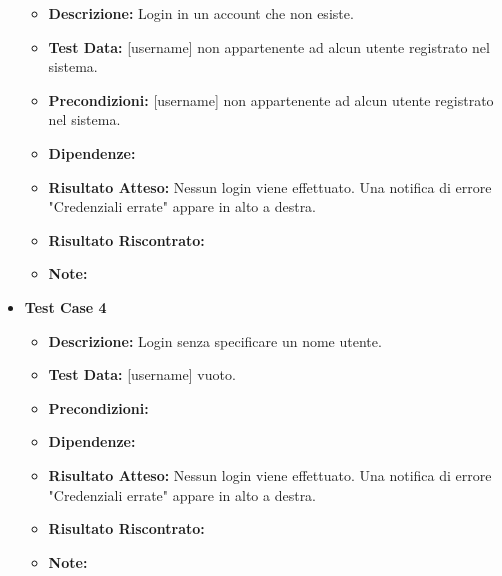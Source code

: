 \begin{itemize}
\begin{itemize}
                    \item \textbf{Descrizione:} Login in un account che non esiste.
                    \item \textbf{Test Data:} [username] non appartenente ad alcun utente registrato nel sistema.
                    \item \textbf{Precondizioni:} [username] non appartenente ad alcun utente registrato nel sistema.
                    \item \textbf{Dipendenze:}
                    \item \textbf{Risultato Atteso:} Nessun login viene effettuato. Una notifica di errore "Credenziali errate" appare in alto a destra.
                    \item \textbf{Risultato Riscontrato:}
                    \item \textbf{Note:}
                \end{itemize}
            \item \textbf{Test Case 4}
                \begin{itemize}
                    \item \textbf{Descrizione:} Login senza specificare un nome utente.
                    \item \textbf{Test Data:} [username] vuoto.
                    \item \textbf{Precondizioni:} 
                    \item \textbf{Dipendenze:}
                    \item \textbf{Risultato Atteso:} Nessun login viene effettuato. Una notifica di errore "Credenziali errate" appare in alto a destra.
                    \item \textbf{Risultato Riscontrato:}
                    \item \textbf{Note:}
                \end{itemize}
        \end{itemize}


